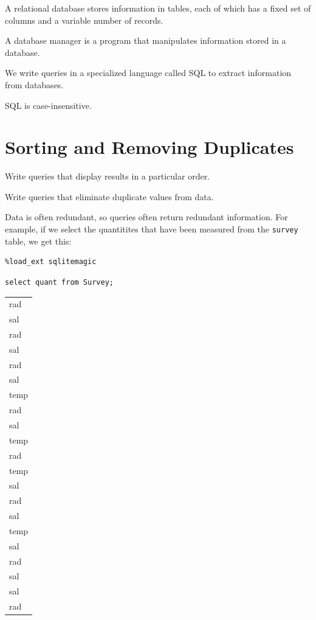 \documentclass{book}
\begin{document}
\begin{keypoints}
\begin{swcitemize}
\item
  A relational database stores information in tables, each of which has
  a fixed set of columns and a variable number of records.
\item
  A database manager is a program that manipulates information stored in
  a database.
\item
  We write queries in a specialized language called SQL to extract
  information from databases.
\item
  SQL is case-insensitive.
\end{swcitemize}
\end{keypoints}

\section{Sorting and Removing Duplicates}

\begin{objectives}
\begin{swcitemize}
\item
  Write queries that display results in a particular order.
\item
  Write queries that eliminate duplicate values from data.
\end{swcitemize}
\end{objectives}

Data is often redundant, so queries often return redundant information.
For example, if we select the quantitites that have been measured from
the \texttt{survey} table, we get this:

\begin{verbatim}
%load_ext sqlitemagic
\end{verbatim}

\begin{verbatim}
select quant from Survey;
\end{verbatim}

\begin{tabular}{l}
rad \\
sal \\
rad \\
sal \\
rad \\
sal \\
temp \\
rad \\
sal \\
temp \\
rad \\
temp \\
sal \\
rad \\
sal \\
temp \\
sal \\
rad \\
sal \\
sal \\
rad \\
\end{tabular}
\end{document}
